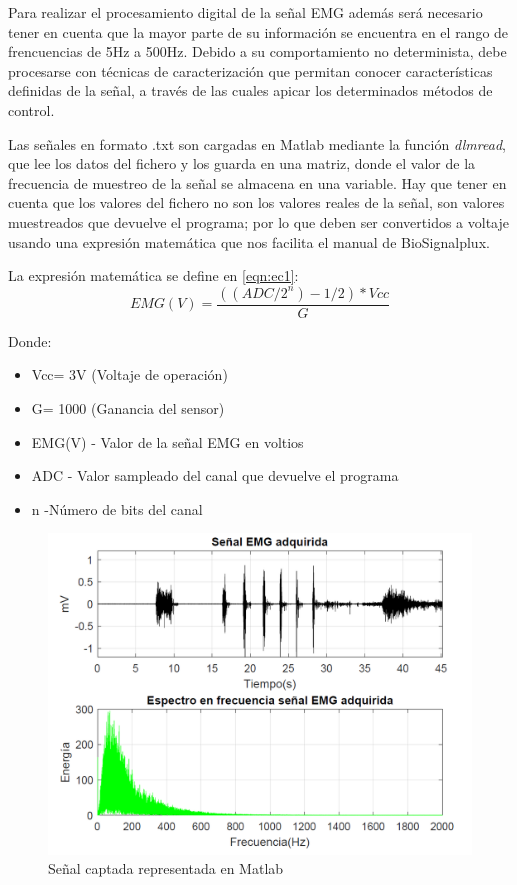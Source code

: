 Para realizar el procesamiento digital de la señal EMG además será necesario tener en cuenta que la mayor parte de su información se encuentra en el rango de frencuencias de 5Hz a 500Hz. Debido a su comportamiento no determinista, debe procesarse con técnicas de caracterización que permitan conocer características definidas de la señal, a través de las cuales apicar los determinados métodos de control. \newline

Las señales en formato .txt son cargadas en Matlab mediante la función \textit{dlmread}, que lee los datos del fichero y los guarda en una matriz, donde el valor de la frecuencia de muestreo de la señal se almacena en una variable. Hay que tener en cuenta que los valores del fichero no son los valores reales de la señal, son valores muestreados que devuelve el programa; por lo que deben ser convertidos a voltaje usando una expresión matemática que nos facilita el manual de BioSignalplux.\newline

 La expresión matemática se define en \ref{eqn:ec1}:
\begin{equation}
EMG(V)=\frac{((ADC/2^n)-1/2)*Vcc}{G}
\label{eqn:ec1}
\end{equation}

Donde: 
\begin{itemize}
	\item Vcc= 3V (Voltaje de operación)
	\item G= 1000 (Ganancia del sensor)
	\item EMG(V) - Valor de la señal EMG en voltios
	\item ADC - Valor sampleado del canal que devuelve el programa
	\item n -Número de bits del canal
\end{itemize}


\begin{figure}[H]
	\center
	\includegraphics[scale=0.5]{imagenes/Disenodelsistema/graf1.png}
	\caption{Señal captada representada en Matlab}
	\label{fig:graf1}
\end{figure}

